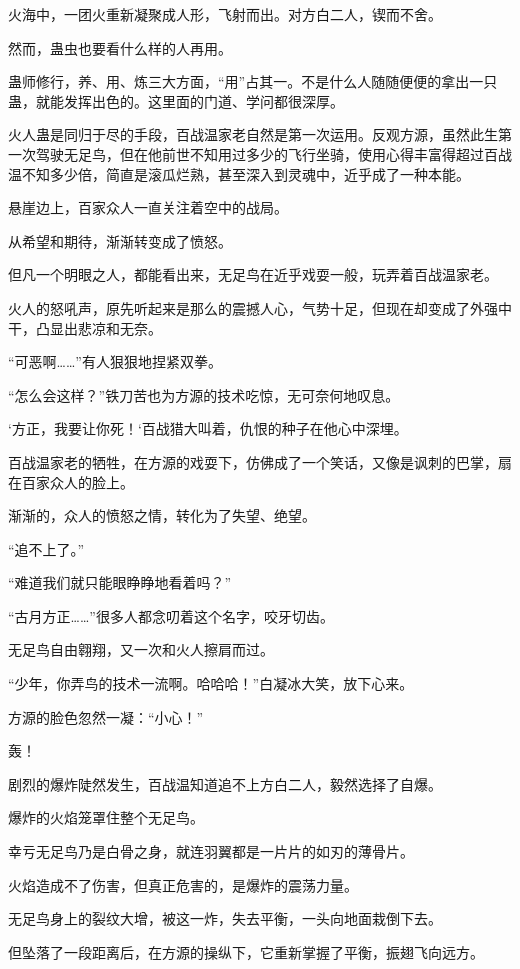 \begin{this_body}
火海中，一团火重新凝聚成人形，飞射而出。对方白二人，锲而不舍。

然而，蛊虫也要看什么样的人再用。

蛊师修行，养、用、炼三大方面，“用”占其一。不是什么人随随便便的拿出一只蛊，就能发挥出色的。这里面的门道、学问都很深厚。

火人蛊是同归于尽的手段，百战温家老自然是第一次运用。反观方源，虽然此生第一次驾驶无足鸟，但在他前世不知用过多少的飞行坐骑，使用心得丰富得超过百战温不知多少倍，简直是滚瓜烂熟，甚至深入到灵魂中，近乎成了一种本能。

悬崖边上，百家众人一直关注着空中的战局。

从希望和期待，渐渐转变成了愤怒。

但凡一个明眼之人，都能看出来，无足鸟在近乎戏耍一般，玩弄着百战温家老。

火人的怒吼声，原先听起来是那么的震撼人心，气势十足，但现在却变成了外强中干，凸显出悲凉和无奈。

“可恶啊……”有人狠狠地捏紧双拳。

“怎么会这样？”铁刀苦也为方源的技术吃惊，无可奈何地叹息。

‘方正，我要让你死！‘百战猎大叫着，仇恨的种子在他心中深埋。

百战温家老的牺牲，在方源的戏耍下，仿佛成了一个笑话，又像是讽刺的巴掌，扇在百家众人的脸上。

渐渐的，众人的愤怒之情，转化为了失望、绝望。

“追不上了。”

“难道我们就只能眼睁睁地看着吗？”

“古月方正……”很多人都念叨着这个名字，咬牙切齿。

无足鸟自由翱翔，又一次和火人擦肩而过。

“少年，你弄鸟的技术一流啊。哈哈哈！”白凝冰大笑，放下心来。

方源的脸色忽然一凝：“小心！”

轰！

剧烈的爆炸陡然发生，百战温知道追不上方白二人，毅然选择了自爆。

爆炸的火焰笼罩住整个无足鸟。

幸亏无足鸟乃是白骨之身，就连羽翼都是一片片的如刃的薄骨片。

火焰造成不了伤害，但真正危害的，是爆炸的震荡力量。

无足鸟身上的裂纹大增，被这一炸，失去平衡，一头向地面栽倒下去。

但坠落了一段距离后，在方源的操纵下，它重新掌握了平衡，振翅飞向远方。


\end{this_body}
